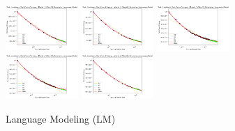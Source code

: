 \documentclass{article} %
\begin{document}
\begin{figure}
    \centering


\includegraphics[width=0.245\textwidth]{figures/scaling_laws_benchmark_dataset_plots__all_functional_forms/validation_loss___1.07e+09.png}
\includegraphics[width=0.245\textwidth]{figures/scaling_laws_benchmark_dataset_plots__all_functional_forms/validation_loss___1.34e+08.png}
\includegraphics[width=0.245\textwidth]{figures/scaling_laws_benchmark_dataset_plots__all_functional_forms/validation_loss___1.68e+07.png}
\includegraphics[width=0.245\textwidth]{figures/scaling_laws_benchmark_dataset_plots__all_functional_forms/validation_loss___2.62e+08.png}
\includegraphics[width=0.245\textwidth]{figures/scaling_laws_benchmark_dataset_plots__all_functional_forms/validation_loss___4.53e+08.png}

    \caption{
    Language Modeling (LM)
    }
    \label{fig:scaling_laws_benchmark_dataset_all_extrapolations__language_modeling}
\end{figure}

\fi


\iffalse
\end{document}
